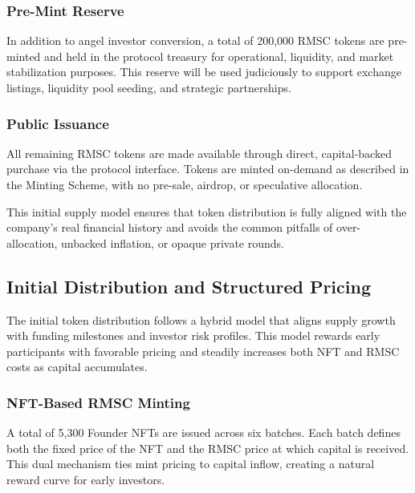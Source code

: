 \documentclass[conference]{IEEEtran}
\begin{document}
\subsubsection{Pre-Mint Reserve}

In addition to angel investor conversion, a total of 200,000 RMSC tokens are pre-minted and held in the protocol treasury for operational, liquidity, and market stabilization purposes. This reserve will be used judiciously to support exchange listings, liquidity pool seeding, and strategic partnerships.

\subsubsection{Public Issuance}

All remaining RMSC tokens are made available through direct, capital-backed purchase via the protocol interface. Tokens are minted on-demand as described in the Minting Scheme, with no pre-sale, airdrop, or speculative allocation.

This initial supply model ensures that token distribution is fully aligned with the company’s real financial history and avoids the common pitfalls of over-allocation, unbacked inflation, or opaque private rounds.

\subsection{Initial Distribution and Structured Pricing}

The initial token distribution follows a hybrid model that aligns supply growth with funding milestones and investor risk profiles. This model rewards early participants with favorable pricing and steadily increases both NFT and RMSC costs as capital accumulates.

\subsubsection{NFT-Based RMSC Minting}

A total of 5,300 Founder NFTs are issued across six batches. Each batch defines both the fixed price of the NFT and the RMSC price at which capital is received. This dual mechanism ties mint pricing to capital inflow, creating a natural reward curve for early investors.
\end{document}
